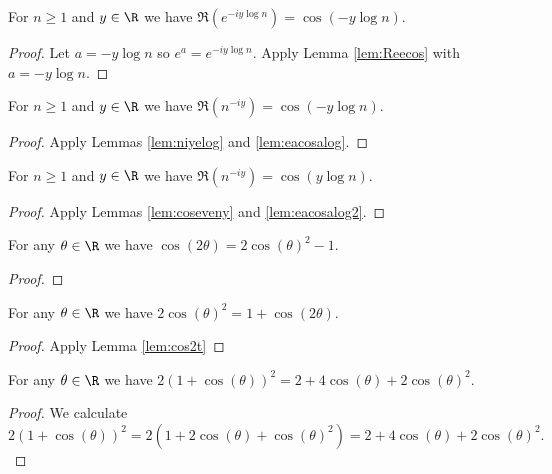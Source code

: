 \begin{lemma}\label{lem:eacosalog}  \leanok
For $n\ge1$ and $y\in\R$ we have $\Re(e^{-iy\log n}) = \cos(-y\log n)$.
\end{lemma}
\begin{proof} \leanok {}
Let $a=-y\log n$ so $e^a = e^{-iy\log n}$. Apply Lemma \ref{lem:Reecos} with $a=-y\log n$.
\end{proof}

\begin{lemma}\label{lem:eacosalog2}  \leanok
For $n\ge1$ and $y\in\R$ we have $\Re(n^{-iy}) = \cos(-y\log n)$.
\end{lemma}
\begin{proof} \leanok {}
Apply Lemmas \ref{lem:niyelog} and \ref{lem:eacosalog}.
\end{proof}

\begin{lemma}\label{lem:eacosalog3}  \leanok
For $n\ge1$ and $y\in\R$ we have $\Re(n^{-iy}) = \cos(y\log n)$.
\end{lemma}
\begin{proof} \leanok {}
Apply Lemmas \ref{lem:coseveny} and \ref{lem:eacosalog2}.
\end{proof}



\begin{lemma}\label{lem:cos2t}  \leanok
For any $\theta\in\R$ we have $\cos(2\theta) = 2\cos(\theta)^2 - 1$.
\end{lemma}
\begin{proof} \leanok
\end{proof}

\begin{lemma}\label{lem:cos2t2}  \leanok
For any $\theta\in\R$ we have $2\cos(\theta)^2 = 1+\cos(2\theta)$.
\end{lemma}
\begin{proof} \leanok {}
Apply Lemma \ref{lem:cos2t}
\end{proof}

\begin{lemma}\label{lem:cosSquare}  \leanok
For any $\theta\in\R$ we have $2(1+\cos(\theta))^2 = 2 + 4\cos(\theta) + 2\cos(\theta)^2$.
\end{lemma}
\begin{proof} \leanok
We calculate $2(1+\cos(\theta))^2 = 2(1 + 2\cos(\theta) + \cos(\theta)^2) = 2 + 4\cos(\theta) + 2\cos(\theta)^2.$
\end{proof}


